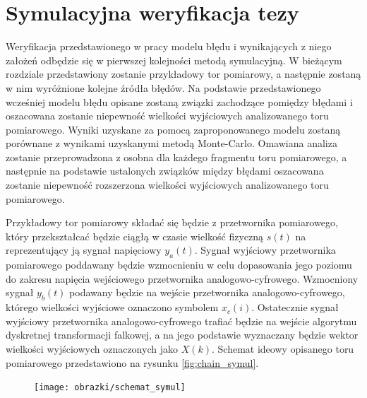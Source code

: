 \chapter{Symulacyjna weryfikacja tezy}

Weryfikacja przedstawionego w pracy modelu błędu i wynikających z niego założeń odbędzie się w pierwszej kolejności metodą symulacyjną. W bieżącym rozdziale przedstawiony zostanie przykładowy tor pomiarowy, a następnie zostaną w nim wyróżnione kolejne źródła błędów. Na podstawie przedstawionego wcześniej modelu błędu opisane zostaną związki zachodzące pomiędzy błędami i oszacowana zostanie niepewność wielkości wyjściowych analizowanego toru pomiarowego. Wyniki uzyskane za pomocą zaproponowanego modelu zostaną porównane z wynikami uzyskanymi metodą Monte-Carlo. Omawiana analiza zostanie przeprowadzona z osobna dla każdego fragmentu toru pomiarowego, a następnie na podstawie ustalonych związków między błędami oszacowana zostanie niepewność rozszerzona wielkości wyjściowych analizowanego toru pomiarowego.

Przykładowy tor pomiarowy składać się będzie z przetwornika pomiarowego, który przekształcać będzie ciągłą w czasie wielkość fizyczną $s(t)$ na reprezentujący ją sygnał napięciowy $y_{a}(t)$. Sygnał wyjściowy przetwornika pomiarowego poddawany będzie wzmocnieniu w celu dopasowania jego poziomu do zakresu napięcia wejściowego przetwornika analogowo-cyfrowego. Wzmocniony sygnał $y_{b}(t)$ podawany będzie na wejście przetwornika analogowo-cyfrowego, którego wielkości wyjściowe oznaczono symbolem $x_{c}(i)$. Ostatecznie sygnał wyjściowy przetwornika analogowo-cyfrowego trafiać będzie na wejście algorytmu dyskretnej transformacji falkowej, a na jego podstawie wyznaczany będzie wektor wielkości wyjściowych oznaczonych jako $X(k)$. Schemat ideowy opisanego toru pomiarowego przedstawiono na rysunku \ref{fig:chain_symul}.

\begin{figure}[htb!]
\begin{center}
\texttt{[image: obrazki/schemat\_symul]}
\end{center}
\end{figure}

